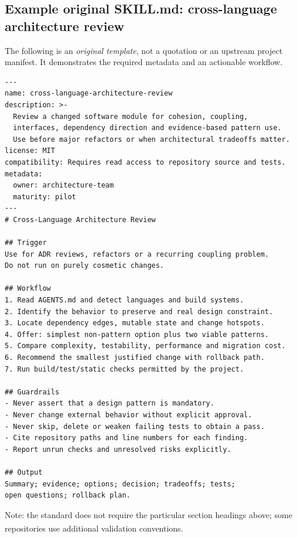 \documentclass[11pt,letterpaper]{article}
\newcommand{\src}[1]{\textsuperscript{\textcolor{teal}{\cite{#1}}}}
\begin{document}
\subsection{Example original SKILL.md: cross-language architecture review}
The following is an \emph{original template}, not a quotation or an upstream project manifest. It demonstrates the required metadata and an actionable workflow.
\begin{verbatim}
---
name: cross-language-architecture-review
description: >-
  Review a changed software module for cohesion, coupling,
  interfaces, dependency direction and evidence-based pattern use.
  Use before major refactors or when architectural tradeoffs matter.
license: MIT
compatibility: Requires read access to repository source and tests.
metadata:
  owner: architecture-team
  maturity: pilot
---
# Cross-Language Architecture Review

## Trigger
Use for ADR reviews, refactors or a recurring coupling problem.
Do not run on purely cosmetic changes.

## Workflow
1. Read AGENTS.md and detect languages and build systems.
2. Identify the behavior to preserve and real design constraint.
3. Locate dependency edges, mutable state and change hotspots.
4. Offer: simplest non-pattern option plus two viable patterns.
5. Compare complexity, testability, performance and migration cost.
6. Recommend the smallest justified change with rollback path.
7. Run build/test/static checks permitted by the project.

## Guardrails
- Never assert that a design pattern is mandatory.
- Never change external behavior without explicit approval.
- Never skip, delete or weaken failing tests to obtain a pass.
- Cite repository paths and line numbers for each finding.
- Report unrun checks and unresolved risks explicitly.

## Output
Summary; evidence; options; decision; tradeoffs; tests;
open questions; rollback plan.
\end{verbatim}
Note: the standard does not require the particular section headings above; some repositories use additional validation conventions.\src{spec}
\end{document}
